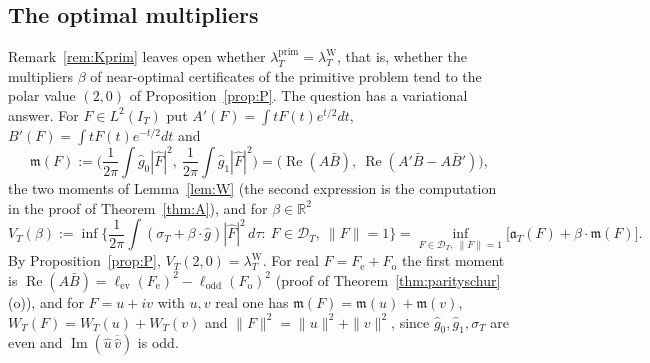 \documentclass[11pt]{amsart}
\theoremstyle{definition}
\theoremstyle{remark}
\newcommand{\R}{\mathbb R}
\newcommand{\Rel}{\operatorname{Re}}
\newcommand{\Iml}{\operatorname{Im}}
\newcommand{\IT}{I_T}
\newcommand{\lamP}{\lambda^{\mathrm{prim}}_T}
\newcommand{\lamW}{\lambda^{\mathrm W}_T}
\newcommand{\sT}{\sigma_T}
\newcommand{\gh}[1]{\widehat g_{#1}}
\newcommand{\Fh}{\widehat F}
\begin{document}
\subsection{The optimal multipliers}\label{subsec:mult}
Remark~\ref{rem:Kprim} leaves open whether $\lamP=\lamW$, that is, whether the multipliers $\beta$ of
near-optimal certificates of the primitive problem tend to the polar value $(2,0)$ of
Proposition~\ref{prop:P}. The question has a variational answer. For $F\in L^2(\IT)$ put
$A'(F)=\int tF(t)e^{t/2}dt$, $B'(F)=\int tF(t)e^{-t/2}dt$ and
\[
\mathfrak m(F):=\Big(\frac1{2\pi}\int\gh0|\Fh|^2,\ \frac1{2\pi}\int\gh1|\Fh|^2\Big)
=\big(\Rel(A\bar B),\ \Rel(A'\bar B-A\bar B')\big),
\]
the two moments of Lemma~\ref{lem:W} (the second expression is the computation in the proof of
Theorem~\ref{thm:A}), and for $\beta\in\R^2$
\[
V_T(\beta):=\inf\Big\{\frac1{2\pi}\int(\sT+\beta\cdot\widehat g)|\Fh|^2\,d\tau:\ F\in\mathcal D_T,\ \|F\|=1\Big\}
=\inf_{F\in\mathcal D_T,\ \|F\|=1}\big[\mathfrak a_T(F)+\beta\cdot\mathfrak m(F)\big].
\]
By Proposition~\ref{prop:P}, $V_T(2,0)=\lamW$. For real $F=F_{\mathrm e}+F_{\mathrm o}$ the first moment is
$\Rel(A\bar B)=\ell_{\mathrm{ev}}(F_{\mathrm e})^2-\ell_{\mathrm{odd}}(F_{\mathrm o})^2$ (proof of
Theorem~\ref{thm:parityschur}(o)), and for $F=u+iv$ with $u,v$ real one has $\mathfrak m(F)=\mathfrak m(u)+\mathfrak m(v)$,
$W_T(F)=W_T(u)+W_T(v)$ and $\|F\|^2=\|u\|^2+\|v\|^2$, since $\gh0,\gh1,\sT$ are even and
$\Iml(\widehat u\,\overline{\widehat v})$ is odd.
\end{document}
